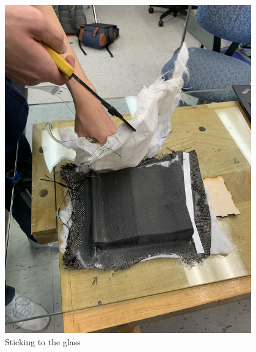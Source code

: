 \begin{figure}[ht]
\centering
\begin{minipage}[b]{.48\textwidth}
  \centering
  \includegraphics[width=0.95\textwidth]{Meetings/February/02-13-22/2-12-22_Hardware_Figure1 - Nathan Forrer.JPG}
  \caption{Sticking to the glass}
  \label{fig:021322_1}
\end{minipage}%
\hfill%
\begin{minipage}[b]{.48\textwidth}
  \centering

\end{minipage}
\end{figure}
